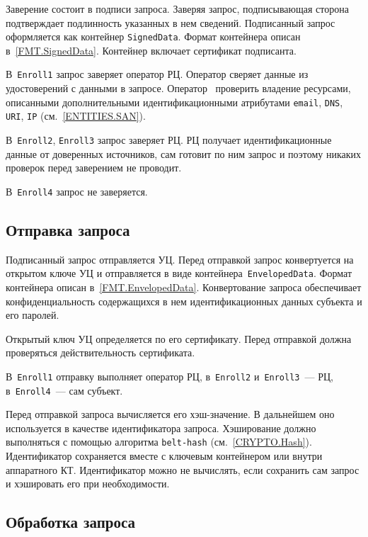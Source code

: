 Заверение состоит в подписи запроса. Заверяя запрос,
подписывающая сторона подтверждает подлинность указанных в нем сведений.
Подписанный запрос оформляется как контейнер \texttt{SignedData}.
Формат контейнера описан в~\ref{FMT.SignedData}. 
Контейнер включает сертификат подписанта.

В~\texttt{Enroll1} запрос заверяет оператор РЦ.
Оператор сверяет данные из удостоверений с данными в запросе.
%
Оператор~ проверить владение ресурсами, описанными
дополнительными идентификационными атрибутами \texttt{email}, \texttt{DNS},
\texttt{URI}, \texttt{IP} (см.~\ref{ENTITIES.SAN}).

В~\texttt{Enroll2}, \texttt{Enroll3} запрос заверяет РЦ.
РЦ получает идентификационные данные от доверенных источников,
сам готовит по ним запрос и поэтому никаких проверок перед заверением
не проводит.  

В~\texttt{Enroll4} запрос не заверяется.

\subsection{Отправка запроса}\label{PROCESSES.Enroll.Enveloped}

Подписанный запрос отправляется УЦ. Перед отправкой запрос конвертуется на 
открытом ключе УЦ и отправляется в виде контейнера~\texttt{EnvelopedData}. 
Формат контейнера описан в~\ref{FMT.EnvelopedData}. 
Конвертование запроса обеспечивает конфиденциальность содержащихся в нем 
идентификационных данных субъекта и его паролей.  

Открытый ключ УЦ определяется по его сертификату. Перед отправкой 
должна проверяться действительность сертификата.

В~\texttt{Enroll1} отправку выполняет оператор РЦ,
в~\texttt{Enroll2} и~\texttt{Enroll3}~--- РЦ,
в~\texttt{Enroll4}~--- сам субъект.

Перед отправкой запроса вычисляется его хэш-значение. 
В дальнейшем оно используется в качестве идентификатора запроса. 
Хэширование должно выполняться с помощью алгоритма 
\texttt{belt-hash} (см.~\ref{CRYPTO.Hash}).
%
Идентификатор сохраняется вместе с ключевым контейнером или внутри 
аппаратного КТ.
%
Идентификатор можно не вычислять, если сохранить сам запрос и хэшировать 
его при необходимости.

\subsection{Обработка запроса}\label{PROCESSES.Enroll.Issue}


